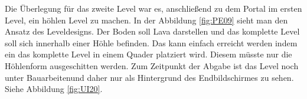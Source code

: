 Die Überlegung für das zweite Level war es, anschließend zu dem Portal im ersten Level, ein höhlen Level zu machen. In der Abbildung \ref{fig:PE09} sieht man den Ansatz des Leveldesigns. Der Boden soll Lava darstellen und das komplette Level soll sich innerhalb einer Höhle befinden. 
Das kann einfach erreicht werden indem ein das komplette Level in einem Quader platziert wird. Diesem müsste nur die Höhlenform ausgeschitten werden. Zum Zeitpunkt der Abgabe ist das Level noch unter \glqq Bauarbeiten\grqq \space und daher nur als Hintergrund des Endbildschirmes zu sehen. Siehe Abbildung \ref{fig:UI20}.



\pagebreak

